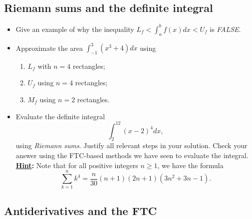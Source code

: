 \documentclass[12pt]{article}
\begin{document}
\subsection{Riemann sums and the definite integral}

\begin{itemize}
     \item Give an example of why the inequality $L_f < \int_a^b f(x) dx < U_f$ is \emph{FALSE}. 
     \item Approximate the area $\int_{-1}^{3} (x^3+4) dx$ using 
           \begin{enumerate}
           \item $L_f$ with $n = 4$ rectangles; 
           \item $U_f$ using $n = 4$ rectangles; 
           \item $M_f$ using $n = 2$ rectangles. 
           \end{enumerate}
     \item Evaluate the definite integral 
           \[
           \int_2^{12} (x-2)^4 dx, 
           \]
           using \emph{Riemann sums}. Justify all relevant steps in your solution. 
           Check your answer using the FTC-based methods we have seen to evaluate the 
           integral. \\ 
           \textbf{\underline{Hint}:} Note that for all positive integers $n \geq 1$, 
           we have the formula 
           \[
           \sum_{k=1}^{n} k^4 = \frac{n}{30} (n+1) (2n+1) (3n^2+3n-1). 
           \]
\end{itemize}

\subsection{Antiderivatives and the FTC} 
\end{document}
